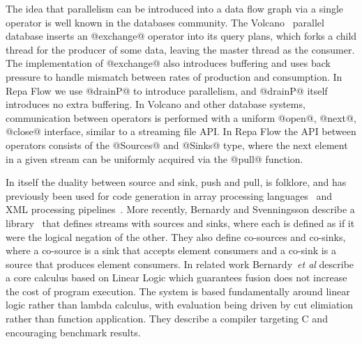 The idea that parallelism can be introduced into a data flow graph via a single operator is well known in the databases community. The Volcano~\cite{Graefe:Volcano} parallel database inserts an @exchange@ operator into its query plans, which forks a child thread for the producer of some data, leaving the master thread as the consumer. The implementation of @exchange@ also introduces buffering and uses back pressure to handle mismatch between rates of production and consumption. In Repa Flow we use @drainP@ to introduce parallelism, and @drainP@ itself introduces no extra buffering. In Volcano and other database systems, communication between operators is performed with a uniform @open@, @next@, @close@ interface, similar to a streaming file API. In Repa Flow the API between operators consists of the @Sources@ and @Sinks@ type, where the next element in a given stream can be uniformly acquired via the @pull@ function.

In itself the duality between source and sink, push and pull, is folklore, and has previously been used for code generation in array processing languages~\cite{Claessen:ExpressiveArray,Svensson:Defunctionalizing} and XML processing pipelines~\cite{Kay:YouPull}. More recently, Bernardy and Svenningsson describe a library~\cite{Bernardy:Duality} that defines streams with sources and sinks, where each is defined as if it were the logical negation of the other. They also define co-sources and co-sinks, where a co-source is a sink that accepts element consumers and a co-sink is a source that produces element consumers. In related work Bernardy~\emph{et al} describe a core calculus \cite{Bernardy:Composable} based on Linear Logic which guarantees fusion does not increase the cost of program execution. The system is based fundamentally around linear logic rather than lambda calculus, with evaluation being driven by cut elimiation rather than function application. They describe a compiler targeting C and encouraging benchmark results.

